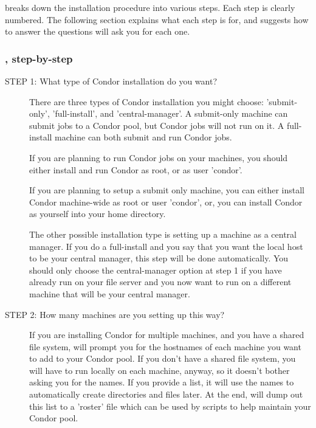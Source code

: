  breaks down the installation procedure into various
steps.  Each step is clearly numbered.  The following section explains
what each step is for, and suggests how to answer the questions
 will ask you for each one.

\subsubsection{, step-by-step}

\begin{description}
\item[STEP 1: What type of Condor installation do you want?]

     There are three types of Condor installation you might choose:
     'submit-only', 'full-install', and 'central-manager'.  A
     submit-only machine can submit jobs to a Condor pool, but Condor
     jobs will not run on it.  A full-install machine can both submit
     and run Condor jobs.  

     If you are planning to run Condor jobs on your machines, you
     should either install and run Condor as root, or as user
     'condor'.  

     If you are planning to setup a submit only machine, you can
     either install Condor machine-wide as root or user 'condor', or,
     you can install Condor as yourself into your home directory.

     The other possible installation type is setting up a machine as a
     central manager.  If you do a full-install and you say that you
     want the local host to be your central manager, this step will be
     done automatically.  You should only choose the central-manager
     option at step 1 if you have already run  on your
     file server and you now want to run  on a different
     machine that will be your central manager.

\item[STEP 2: How many machines are you setting up this way?]

     If you are installing Condor for multiple machines, and you have
     a shared file system,  will prompt you for the
     hostnames of each machine you want to add to your Condor pool.
     If you don't have a shared file system, you will have to run
      locally on each machine, anyway, so it doesn't
     bother asking you for the names.  If you provide a list, it will
     use the names to automatically create directories and files
     later.  At the end,  will dump out this list to a
     'roster' file which can be used by scripts to help maintain your
     Condor pool.


\end{description}
